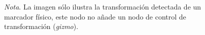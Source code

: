 \begin{figure}[H]
    \caption{Nodo de marcador}
    \centering
    \caption*{\textit{Nota}. \textnormal{La imagen sólo ilustra la transformación detectada de un marcador físico, este nodo no añade un nodo de control de transformación (\textit{gizmo}).}}
    \label{fig:node_augmented_image}
\end{figure}
